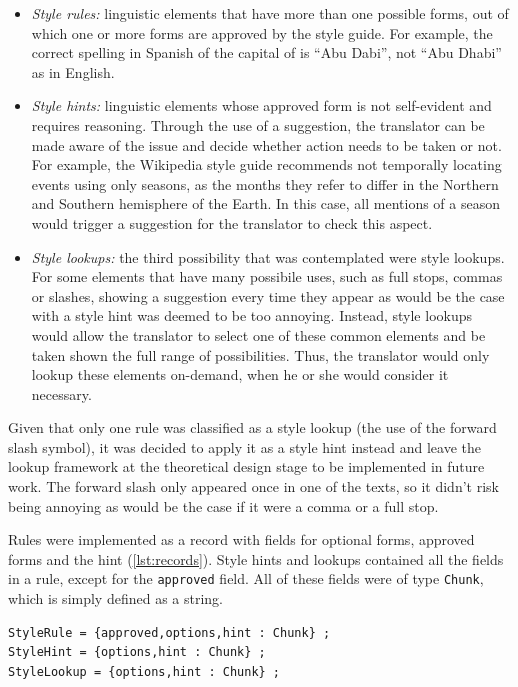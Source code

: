 \begin{itemize}
    \item \textit{Style rules:} linguistic elements that have more than one possible forms, out of which one or more forms are approved by the style guide. For example, the correct spelling in Spanish of the capital of  is ``Abu Dabi'', not ``Abu Dhabi'' as in English.
    \item \textit{Style hints:} linguistic elements whose approved form is not self-evident and requires reasoning. Through the use of a suggestion, the translator can be made aware of the issue and decide whether action needs to be taken or not. For example, the Wikipedia style guide recommends not temporally locating events using only seasons, as the months they refer to differ in the Northern and Southern hemisphere of the Earth. In this case, all mentions of a season would trigger a suggestion for the translator to check this aspect.
    \item \textit{Style lookups:} the third possibility that was contemplated were style lookups. For some elements that have many possibile uses, such as full stops, commas or slashes, showing a suggestion every time they appear as would be the case with a style hint was deemed to be too annoying. Instead, style lookups would allow the translator to select one of these common elements and be taken shown the full range of possibilities. Thus, the translator would only lookup these elements on-demand, when he or she would consider it necessary.
\end{itemize}

Given that only one rule was classified as a style lookup (the use of the forward slash symbol), it was decided to apply it as a style hint instead and leave the lookup framework at the theoretical design stage to be implemented in future work. The forward slash only appeared once in one of the texts, so it didn't risk being annoying as would be the case if it were a comma or a full stop.

Rules were implemented as a record with fields for optional forms, approved forms and the hint (\autoref{lst:records}). Style hints and lookups contained all the fields in a rule, except for the \texttt{approved} field. All of these fields were of type \texttt{Chunk}, which is simply defined as a string.

\begin{lstlisting}[caption={Record structure for the rule types},label=lst:records]
StyleRule = {approved,options,hint : Chunk} ;
StyleHint = {options,hint : Chunk} ;
StyleLookup = {options,hint : Chunk} ;
\end{lstlisting}

